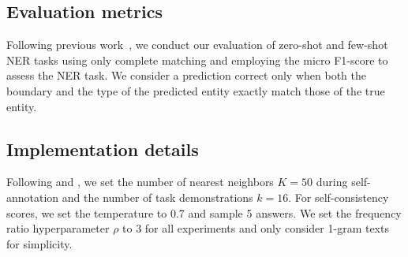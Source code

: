 \subsection{Evaluation metrics}
Following previous work~\citep{DBLP:conf/emnlp/XieLZZLW23,DBLP:journals/corr/abs-2311-08921}, we conduct our evaluation of zero-shot and few-shot \ac{NER} tasks using only complete matching and employing the micro F1-score to assess the NER task. We consider a prediction correct only when both the boundary and the type of the predicted entity exactly match those of the true entity.


\subsection{Implementation details}
Following \citet{DBLP:journals/corr/abs-2311-08921} and \citet{DBLP:conf/ijcai/0001LLOQ21}, we set the number of nearest neighbors \(K=50\) during self-annotation and the number of task demonstrations \(k=16\). For self-consistency scores, we set the temperature to 0.7 and sample 5 answers. We set the frequency ratio hyperparameter \(\rho\) to 3 for all experiments and only consider 1-gram texts for simplicity.



